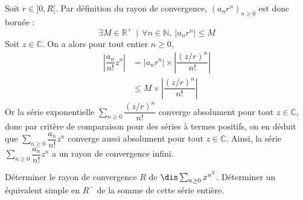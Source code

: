 \documentclass[a4paper,10pt]{report}
\newcommand{\Sum}[2]{\ensuremath{\textstyle{\sum\limits_{#1}^{#2}}}}
\begin{document}
\corr Soit $r\in ]0,R[$. Par définition du rayon de convergence, $(a_n r^n)_{n \geq 0}$ est donc bornée : 
\[
\exists M\in\mathbb{R}^+\,\mid\, \forall n\in\mathbb{N},\ \vert a_n r^n\vert \leq M
\]
Soit $z\in\mathbb{C}$. On a alors pour tout entier $n \geq 0$,
\begin{align*}
\left\vert \dfrac{a_n}{n!} z^n \right\vert & =\vert a_n r^n\vert \times \left\vert\dfrac{(z/r)^n}{n!}\right\vert \\
&  \leq M\times \left\vert\dfrac{(z/r)^n}{n!}\right\vert
\end{align*}
Or la série exponentielle $\Sum{n \geq 0}{} \dfrac{(z/r)^n}{n!}$ converge absolument pour tout $z\in\mathbb{C}$, donc par critère de comparaison pour des séries à termes positifs, on en déduit que $\Sum{n \geq 0}{} \dfrac{a_n}{n!} z^n$ converge aussi absolument pour tout $z\in\mathbb{C}$. Ainsi, la série $\Sum{n \geq 0}{} \dfrac{a_n}{n!} z^n$ a un rayon de convergence infini.

\begin{Exercice}{} Déterminer le rayon de convergence $R$ de $\dis \sum_{n \geq 0} x^{n^2}$. Déterminer un équivalent simple en $R^{-}$ de la somme de cette série entière.
\end{Exercice}
\end{document}
